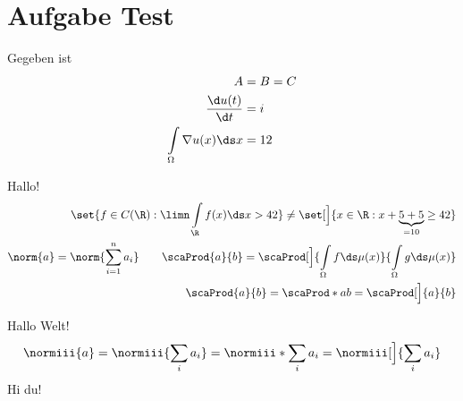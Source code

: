 
\section{Aufgabe Test}
\begin{thm}
	Gegeben ist
	\begin{align*}
		A&=B=C\\
		\frac{\d u(t)}{\d t}&= i\\
		\int\limits_\Omega\nabla u(x)\ds x&=12
	\end{align*}
\end{thm}

\begin{thm}
	Hallo! 
	\begin{align*}
		\set{f\in C(\R):\limn\int\limits_\R f(x)\ds x>42}\neq\set[\Big]{x\in\R:x+\underbrace{5+5}_{=10}\geq42}\\
		\norm{a}=\norm{\sum\limits_{i=1}^n a_i}\qquad
		\scaProd{a}{b}=\scaProd[\Big]{\int\limits_\Omega f\ds\mu(x)}{\int\limits_\Omega g\ds\mu(x)}\\
		\scaProd{a}{b}=\scaProd*{a}{b}=\scaProd[\Big]{a}{b}
	\end{align*}
\end{thm}
\newpage
\begin{theorem}
	Hallo Welt! 
	\begin{align*}
		\normiii{a}
		=\normiii{\sum\limits_i a_i}
		=\normiii*{\sum\limits_i a_i}
		=\normiii[\Big]{\sum\limits_i a_i}
	\end{align*}
	\newpage
	Hi  du!
\end{theorem}